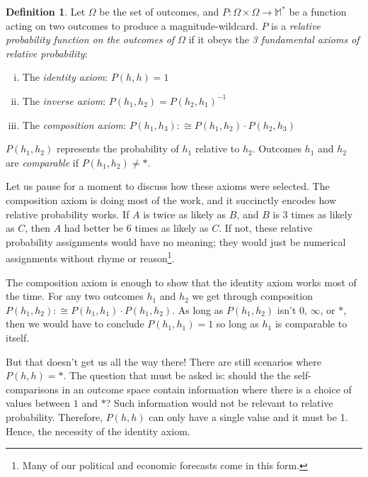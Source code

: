 \documentclass[twoside]{article}
\theoremstyle{plain}%
\theoremstyle{definition}
\newtheorem{definition}{Definition}[section]
\theoremstyle{remark}
\begin{document}
\begin{definition}
\label{def:fundamental_laws}
Let \(\Omega\) be the set of outcomes, and \(P: \Omega \times \Omega \rightarrow \mathbb{M}^*\) be a function acting on two outcomes to produce a magnitude-wildcard. \(P\) is a \textit{relative probability function on the outcomes of \(\Omega\)} if it obeys the \textit{3 fundamental axioms of relative probability}:

\begin{enumerate}[(i)]
\item The \textit{identity axiom}: \(P(h, h) = 1\)
\item The \textit{inverse axiom}: \(P(h_1, h_2) = P(h_2, h_1)^{-1}\)
\item The \textit{composition axiom}: \(P(h_1, h_3) :\cong P(h_1, h_2) \cdot P(h_2, h_3)\)
\end{enumerate}

\end{definition}

\(P(h_1, h_2)\) represents the probability of \(h_1\) relative to \(h_2\). Outcomes \(h_1\) and \(h_2\) are \textit{comparable} if \(P(h_1, h_2) \neq \ast\).

Let us pause for a moment to discuss how these axioms were selected. The composition axiom is doing most of the work, and it succinctly encodes how relative probability works. If \(A\) is twice as likely as \(B\), and \(B\) is 3 times as likely as \(C\), then \(A\) had better be 6 times as likely as \(C\). If not, these relative probability assignments would have no meaning; they would just be numerical assignments without rhyme or reason\footnote{Many of our political and economic forecasts come in this form.}.

The composition axiom is enough to show that the identity axiom works most of the time. For any two outcomes \(h_1\) and \(h_2\) we get through composition \(P(h_1, h_2) :\cong P(h_1, h_1) \cdot P(h_1, h_2)\). As long as \(P(h_1, h_2)\) isn't \(0\), \(\infty\), or \(\ast\), then we would have to conclude \(P(h_1, h_1) = 1\) so long as \(h_1\) is comparable to itself.

But that doesn't get us all the way there! There are still scenarios where \(P(h, h) = \ast\). The question that must be asked is: should the the self-comparisons in an outcome space contain information where there is a choice of values between \(1\) and \(\ast\)? Such information would not be relevant to relative probability. Therefore, \(P(h, h)\) can only have a single value and it must be 1. Hence, the necessity of the identity axiom.
\end{document}
